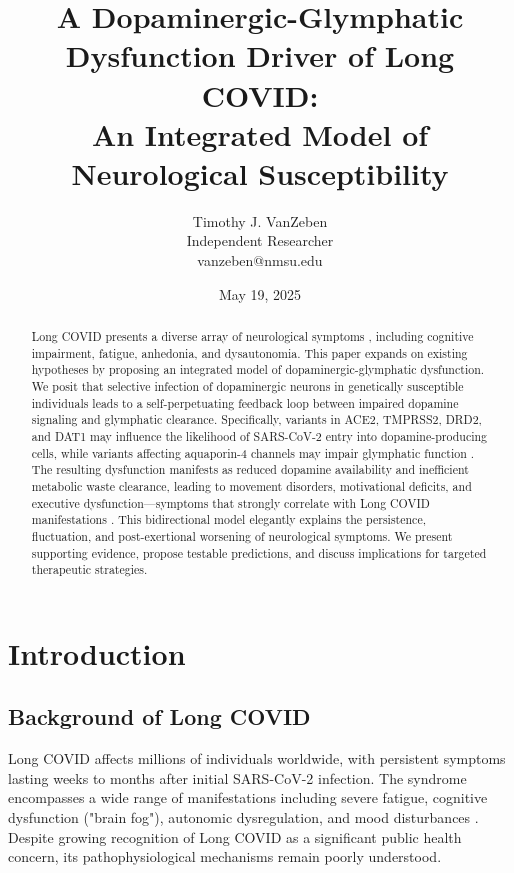 \documentclass[12pt]{article}
\title{A Dopaminergic-Glymphatic Dysfunction Driver of Long COVID: \\ An Integrated Model of Neurological Susceptibility}
\author{Timothy J. VanZeben \\ Independent Researcher \\ vanzeben@nmsu.edu}
\date{May 19, 2025}
\begin{document}
\maketitle

\begin{abstract}
Long COVID presents a diverse array of neurological symptoms \citep{taquet2021neuropsychiatric, reiken2022alzheimersignaling}, including cognitive impairment, fatigue, anhedonia, and dysautonomia. This paper expands on existing hypotheses by proposing an integrated model of dopaminergic-glymphatic dysfunction. We posit that selective infection of dopaminergic neurons in genetically susceptible individuals leads to a self-perpetuating feedback loop between impaired dopamine signaling and glymphatic clearance. Specifically, variants in ACE2, TMPRSS2, DRD2, and DAT1 may influence the likelihood \citep{novelli2020ace2variants, asselta2020ace2tmprss2} of SARS-CoV-2 entry into dopamine-producing cells, while variants affecting aquaporin-4 channels may impair glymphatic function \citep{boespflug2018, Mestre2020}. The resulting dysfunction manifests as reduced dopamine availability and inefficient metabolic waste clearance, leading to movement disorders, motivational deficits, and executive dysfunction—symptoms that strongly correlate with Long COVID manifestations \citep{davis2021longcovidcohort, graham2021longcovidneuro}. This bidirectional model elegantly explains the persistence, fluctuation, and post-exertional worsening of neurological symptoms. We present supporting evidence, propose testable predictions, and discuss implications for targeted therapeutic strategies.
\end{abstract}

\section{Introduction}

\subsection{Background of Long COVID}

Long COVID affects millions of individuals worldwide, with persistent symptoms lasting weeks to months after initial SARS-CoV-2 infection. The syndrome encompasses a wide range of manifestations including severe fatigue, cognitive dysfunction ("brain fog"), autonomic dysregulation, and mood disturbances \citep{davis2021longcovidcohort}. Despite growing recognition of Long COVID as a significant public health concern, its pathophysiological mechanisms remain poorly understood.
\end{document}
